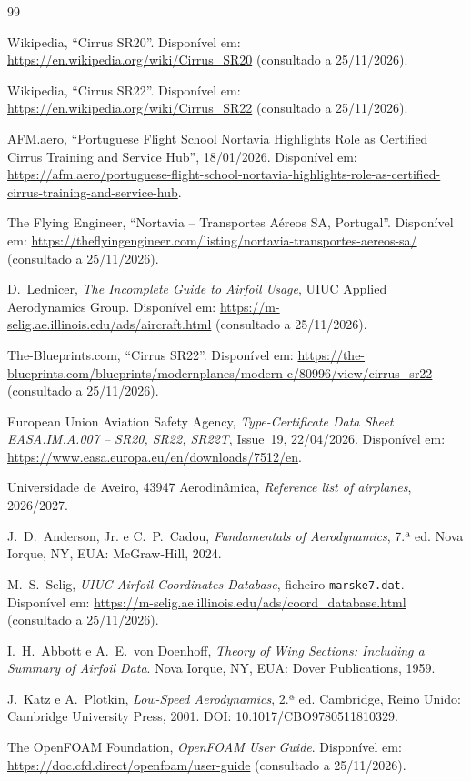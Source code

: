 \begin{thebibliography}{99}

Wikipedia, ``Cirrus SR20''. Disponível em:
\url{https://en.wikipedia.org/wiki/Cirrus_SR20} (consultado a 25/11/2026).

Wikipedia, ``Cirrus SR22''. Disponível em:
\url{https://en.wikipedia.org/wiki/Cirrus_SR22} (consultado a 25/11/2026).

AFM.aero, ``Portuguese Flight School Nortavia Highlights Role as Certified Cirrus
Training and Service Hub'', 18/01/2026. Disponível em:
\url{https://afm.aero/portuguese-flight-school-nortavia-highlights-role-as-certified-cirrus-training-and-service-hub}.

The Flying Engineer, ``Nortavia -- Transportes Aéreos SA, Portugal''. Disponível
em: \url{https://theflyingengineer.com/listing/nortavia-transportes-aereos-sa/}
(consultado a 25/11/2026).

D.~Lednicer, \emph{The Incomplete Guide to Airfoil Usage}, UIUC Applied
Aerodynamics Group. Disponível em:
\url{https://m-selig.ae.illinois.edu/ads/aircraft.html} (consultado a 25/11/2026).

The-Blueprints.com, ``Cirrus SR22''. Disponível em:
\url{https://the-blueprints.com/blueprints/modernplanes/modern-c/80996/view/cirrus_sr22}
(consultado a 25/11/2026).

European Union Aviation Safety Agency, \emph{Type-Certificate Data Sheet
EASA.IM.A.007 -- SR20, SR22, SR22T}, Issue~19, 22/04/2026. Disponível em:
\url{https://www.easa.europa.eu/en/downloads/7512/en}.

Universidade de Aveiro, 43947 Aerodinâmica, \emph{Reference list of airplanes},
2026/2027.

J.~D.~Anderson, Jr. e C.~P.~Cadou, \emph{Fundamentals of Aerodynamics}, 7.ª ed.
Nova Iorque, NY, EUA: McGraw-Hill, 2024.

M.~S.~Selig, \emph{UIUC Airfoil Coordinates Database}, ficheiro
\texttt{marske7.dat}. Disponível em:
\url{https://m-selig.ae.illinois.edu/ads/coord_database.html} (consultado a
25/11/2026).

I.~H.~Abbott e A.~E.~von Doenhoff, \emph{Theory of Wing Sections: Including a
Summary of Airfoil Data}. Nova Iorque, NY, EUA: Dover Publications, 1959.

J.~Katz e A.~Plotkin, \emph{Low-Speed Aerodynamics}, 2.ª ed. Cambridge, Reino
Unido: Cambridge University Press, 2001. DOI: 10.1017/CBO9780511810329.

The OpenFOAM Foundation, \emph{OpenFOAM User Guide}. Disponível em:
\url{https://doc.cfd.direct/openfoam/user-guide} (consultado a 25/11/2026).

\end{thebibliography}
